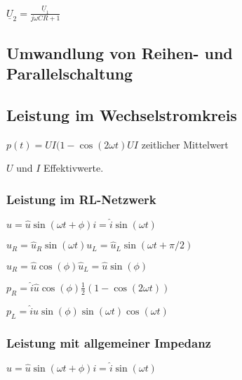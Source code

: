 \documentclass[10pt,a4paper]{scrartcl}
\begin{document}
\begin{multicols*}{3}
	\vspace{1ex}
	
	
	
	$\underline{U}_2=\frac{\underline{U}_1}{j\omega CR +1}$
	
	 
	
	\subsection{Umwandlung von Reihen- und Parallelschaltung}
	
	
	
	 
	
	\subsection{Leistung im Wechselstromkreis}
	
	$p(t)=UI(1-\cos(2\omega t)$\hfill $UI$ zeitlicher Mittelwert
	
	$U$ und $I$ Effektivwerte.
	
	 
	
	\subsubsection{Leistung im RL-Netzwerk}
	
	$u=\hat{u}\sin(\omega t +\phi)$\hfill$i=\hat{i}\sin(\omega t)$
	
	$u_R=\hat{u}_R\sin(\omega t)$\hfill$u_L=\hat{u}_L\sin(\omega t+\pi/2)$
	
	
	$\hat{u}_R=\hat{u}\cos(\phi)$\hfill$\hat{u}_L=\hat{u}\sin(\phi)$
	
	$p_R=\hat{i}\hat{u}\cos(\phi)\frac{1}{2}(1-\cos(2\omega t))$
	
	$p_L=\hat{i}\hat{u}\sin(\phi)\sin(\omega t)\cos(\omega t)$
	
	 
	
	\subsubsection{Leistung mit allgemeiner Impedanz}
	
	$u=\hat{u}\sin(\omega t +\phi)$\hfill$i=\hat{i}\sin(\omega t)$
	

\end{multicols*}
\end{document}
